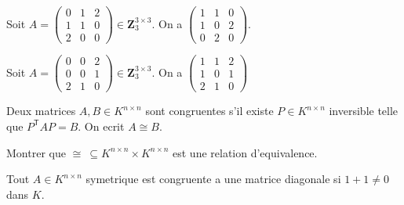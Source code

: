 
\begin{example}
Soit $A=\begin{pmatrix}0 & 1 & 2 \\ 1 & 1 & 0 \\ 2 & 0 & 0\end{pmatrix}\in \mathbf{Z}_{3}^{3\times 3}$. On a $\begin{pmatrix}1 & 1 & 0 \\ 1 & 0 & 2 \\ 0 & 2 & 0\end{pmatrix}$.
\end{example}
\begin{example}
Soit $A=\begin{pmatrix}0 & 0 & 2 \\ 0 & 0 & 1 \\ 2 & 1 & 0\end{pmatrix}\in \mathbf{Z}_{3}^{3\times 3}$. On a $\begin{pmatrix}1 & 1 & 2 \\ 1 & 0 & 1 \\ 2 & 1 & 0\end{pmatrix}$
\end{example}

\begin{definition}
Deux matrices $A,B\in K^{n\times n}$ sont congruentes s'il existe $P\in K^{n\times n}$ inversible telle que $P^{\mathsf{T}}AP=B$. On ecrit $A\cong B$.
\end{definition}
\begin{exercise}
Montrer que $\cong ~\subseteq K^{n\times n}\times K^{n\times n}$ est une relation d'equivalence.
\end{exercise}
\begin{theorem}
Tout $A\in K^{n\times n}$ symetrique est congruente a une matrice diagonale si $1+1\neq 0$ dans $K$.
\end{theorem}

